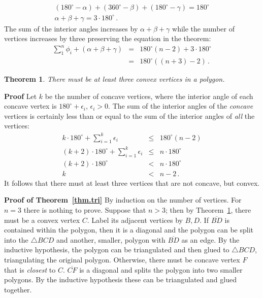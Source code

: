 \documentclass[11pt,a4paper]{article}
\newtheorem{theorem}{Theorem}
\newenvironment{form}[1]{%
\begin{displaymath}%
\renewcommand{\arraystretch}{#1}%
\begin{array}{lcl}}%
{\end{array}%
\end{displaymath}%
}
\begin{document}
\begin{form}{1.2}
(180^\circ - \alpha) + (360^\circ - \beta) + (180^\circ - \gamma) = 180^\circ\\
\alpha + \beta + \gamma = 3\cdot 180^\circ\,.
\end{form}
The sum of the interior angles increases by $\alpha+\beta+\gamma$ while the number of vertices increases by three preserving the equation in the theorem:
\begin{form}{1.4}
\displaystyle\sum_1^n \phi_i + (\alpha + \beta + \gamma) &=& 180^\circ(n-2)+3\cdot 180^\circ\\
&=& 180^\circ((n+3)-2)\,.
\end{form}
\begin{theorem}\label{thm.convex}
There must be at least three convex vertices in a polygon.
\end{theorem}

\textbf{Proof} Let $k$ be the number of concave vertices, where the interior angle of each concave vertex is $180^\circ+\epsilon_i$, $\epsilon_i>0$. The sum of the interior angles of the \emph{concave} vertices is certainly less than or equal to the sum of the interior angles of \emph{all} the vertices:
\begin{form}{1.4}
k\cdot 180^\circ +\displaystyle\sum_{i=1}^{k}\epsilon_i &\leq& 180^\circ(n-2)\\
(k+2)\cdot 180^\circ +\displaystyle\sum_{i=1}^{k}\epsilon_i &\leq& n\cdot 180^\circ\\
(k+2)\cdot 180^\circ &<& n\cdot 180^\circ\\
k&<&n-2\,.
\end{form}
It follows that there must at least three vertices that are not concave, but convex.

\textbf{Proof of Theorem~\ref{thm.tri}} By induction on the number of vertices. For $n=3$ there is nothing to prove. Suppose that $n>3$; then by Theorem~\ref{thm.convex}, there must be a convex vertex $C$. Label its adjacent vertices by $B,D$. If $\overline{BD}$ is contained within the polygon, then it is a diagonal and the polygon can be split into the $\triangle BCD$ and another, smaller, polygon with $\overline{BD}$ as an edge. By the inductive hypothesis, the polygon can be triangulated and then glued to $\triangle BCD$, triangulating the original polygon. Otherwise, there must be concave vertex $F$ that is \emph{closest} to $C$. $\overline{CF}$ is a diagonal and splits the polygon into two smaller polygons. By the inductive hypothesis these can be triangulated and glued together.
\begin{center}
\end{center}
\end{document}
